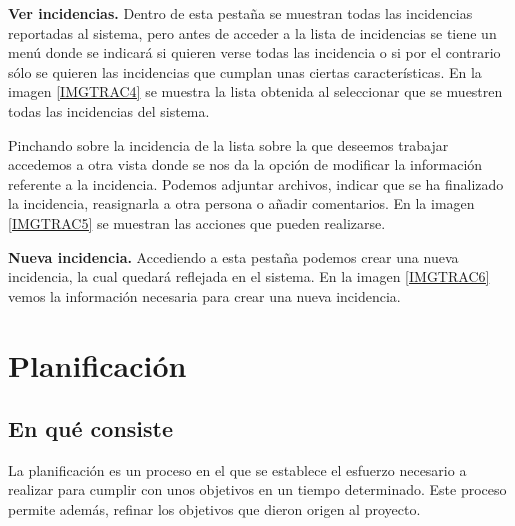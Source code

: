 \documentclass[11pt,a4paper,spanish,twoside]{report}
\begin{document}
\begin{description}

          \item \textbf{Ver incidencias.} Dentro de esta pestaña se muestran
            todas las incidencias reportadas al sistema, pero antes de
            acceder a la lista de incidencias se tiene un menú donde se
            indicará si quieren verse todas las incidencia o si por el
            contrario sólo se quieren las incidencias que cumplan unas
            ciertas características.
            En la imagen \ref{IMGTRAC4} se muestra la lista obtenida al
            seleccionar que se muestren todas las incidencias del sistema.


            Pinchando sobre la incidencia de la lista sobre la que deseemos
            trabajar accedemos a otra vista donde se nos da la opción de
            modificar la información referente a la incidencia. Podemos
            adjuntar archivos, indicar que se ha finalizado la incidencia,
            reasignarla a otra persona o añadir comentarios. En la imagen
            \ref{IMGTRAC5} se muestran las acciones que pueden realizarse.


          \item \textbf{Nueva incidencia.} Accediendo a esta pestaña podemos
            crear una nueva incidencia, la cual quedará reflejada en el
            sistema. En la imagen \ref{IMGTRAC6} vemos la información
            necesaria para crear una nueva incidencia.


        \end{description}

\chapter{Planificación}
\section{En qué consiste}
La planificación es un proceso en el que se establece el esfuerzo necesario
a realizar para cumplir con unos objetivos en un tiempo determinado. Este
proceso permite además, refinar los objetivos que dieron origen al proyecto.
\end{document}
